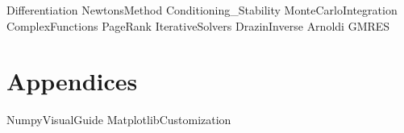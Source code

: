 \documentclass[opener-c,labs,blue,nociteref]{HJnewsiambook}
\begin{document}
{Differentiation}
{NewtonsMethod}
{Conditioning_Stability}
{MonteCarloIntegration}
{ComplexFunctions}
{PageRank}
{IterativeSolvers}
{DrazinInverse}
{Arnoldi}
{GMRES}

\fi

\part{Appendices} %
\begin{appendices}
{NumpyVisualGuide}
{MatplotlibCustomization}
\end{appendices}



\end{document}
